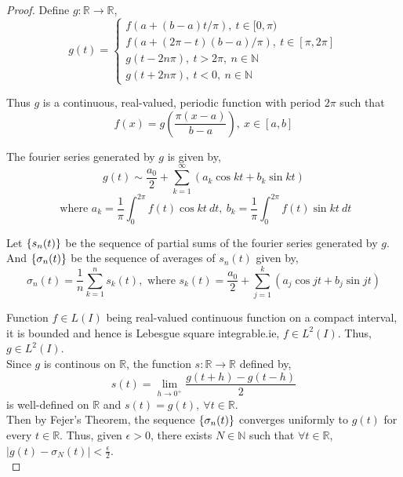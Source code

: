	\begin{proof}
		Define \(g : \mathbb{R} \to \mathbb{R}\),
		\[ g(t) = \begin{cases}
			f(a+(b-a)t/\pi),\ t \in [0,\pi) \\
			f(a+(2\pi-t)(b-a)/\pi),\ t \in [\pi,2\pi] \\
			g(t - 2n\pi),\ t > 2\pi,\ n \in \mathbb{N} \\
			g(t+2n\pi),\ t < 0,\ n \in \mathbb{N}
			\end{cases}\]

		Thus $g$ is a continuous, real-valued, periodic function with period $2\pi$ such that
		\begin{equation}
			f(x) = g\left(\frac{\pi (x-a)}{b-a}\right),\ x \in [a,b]
			\label{equ:fx}
		\end{equation}

		The fourier series generated by $g$ is given by,
		\[ g(t) \sim \frac{a_0}{2} + \sum_{k=1}^\infty \left( a_k \cos kt + b_k \sin kt \right)\]
		\[ \text{ where } a_k = \frac{1}{\pi} \int_0^{2\pi} f(t) \cos kt\ dt,\ b_k = \frac{1}{\pi} \int_0^{2\pi} f(t) \sin kt\ dt\]

		Let \(\{s_n(t)\}\) be the sequence of partial sums of the fourier series generated by $g$. And \( \{\sigma_n(t)\}\)  be the sequence of averages of $s_n(t)$ given by,
		\[\sigma_n(t) = \frac{1}{n} \sum_{k = 1}^n s_k(t),\text{ where } s_k(t) = \frac{a_0}{2} + \sum_{j = 1}^k \left( a_j \cos jt + b_j \sin jt \right)\]

		Function \(f \in L(I)\) being real-valued continuous function on a compact interval, it is bounded and hence is Lebesgue square integrable.ie, \(f \in L^2(I)\). Thus, \(g \in L^2(I)\).\\

		Since $g$ is continous on $\mathbb{R}$, the function \(s : \mathbb{R} \to \mathbb{R}\) defined by,
		\[ s(t) = \lim_{h \to 0^+} \frac{g(t+h)-g(t-h)}{2} \]
		is well-defined on $\mathbb{R}$ and \(s(t) = g(t),\ \forall t \in \mathbb{R}\).\\

		Then by Fejer's Theorem, the sequence \(\{\sigma_n(t)\}\) converges uniformly to $g(t)$ for every \(t \in \mathbb{R}\). Thus, given \(\epsilon > 0\), there exists \(N \in \mathbb{N}\) such that \(\forall t \in \mathbb{R}\), \(|g(t)-\sigma_N(t)| < \frac{\epsilon}{2}\).\\


\end{proof}
